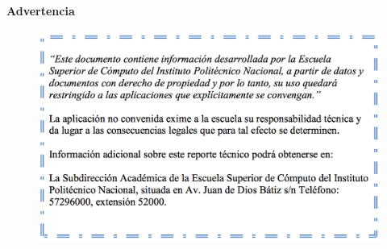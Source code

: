 \thispagestyle{empty}
\vspace*{\fill}
	\centerline{\fontsize{19}{29}\selectfont \bf Advertencia}
	\begin{figure}[htbp]
		\centering
		\includegraphics[width=1\textwidth]{Figuras/advertencia.png}
	\end{figure}
\vspace*{\fill}